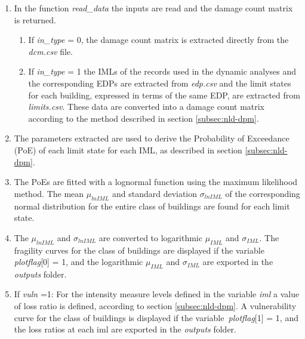 \begin{enumerate}
\item In the function \textit{read\_data} the inputs are read and the damage count matrix is returned.
\begin{enumerate}
\item If \textit{in\_type} = 0, the damage count matrix is extracted directly from the \textit{dcm.csv} file.

\item If \textit{in\_type} = 1 the IMLs of the records used in the dynamic analyses and the corresponding EDPs are extracted from \textit{edp.csv} and the limit states for each building, expressed in terms of the same EDP, are extracted from \textit{limits.csv}.	 These data are converted into a damage count matrix according to the method described in section \ref{subsec:nld-dpm}.
\end{enumerate}

\item The parameters extracted are used to derive the Probability of Exceedance (PoE) of each limit state for each IML, as described in section \ref{subsec:nld-dpm}.

\item The PoEs are fitted with a lognormal function using the maximum likelihood method. The mean $\mu_{ln IML}$ and standard deviation $\sigma_{ln IML}$ of the corresponding normal distribution for the entire class of buildings are found for each limit state.

\item The $\mu_{ln IML}$ and $\sigma_{ln IML}$ are converted to logarithmic $\mu_{IML}$ and $\sigma_{IML}$. The fragility curves for the class of buildings are displayed if the variable \textit{plotflag}[0] = 1, and the logarithmic $\mu_{IML}$ and $\sigma_{IML}$ are exported in the \textit{outputs} folder.

\item If \textit{vuln} =1:  For the intensity measure levels defined in the variable \textit{iml} a value of loss ratio is defined, according to section \ref{subsec:nld-dpm}. A vulnerability curve for the class of buildings is displayed if the variable~\textit{plotflag}[1] = 1, and the loss ratios at each iml are exported in the \textit{outputs} folder.

\end{enumerate}
